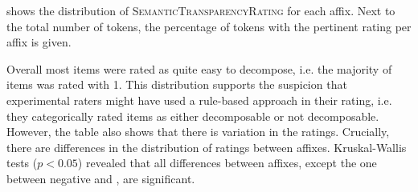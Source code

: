  shows the distribution of \textsc{SemanticTransparencyRating} for each affix. Next to the total number of tokens, the percentage of tokens with the pertinent rating per affix is given. 


\begin{table}

	\caption{Semantic Transparency Rating  by affix }
	\label{tbl:Exp distribution semantic transparency rating}
	
	
\end{table}

Overall most  items were rated as quite easy to decompose, i.e. the majority of items was rated with 1. This distribution supports the suspicion that experimental raters might have used a rule-based approach in their rating, i.e. they categorically rated items as either decomposable or not decomposable. 
However, the table also shows that there is variation in the ratings. 
Crucially, there are differences in the distribution of ratings between affixes. Kruskal-Wallis tests ($p<0.05$) revealed that all differences between affixes, except the one between negative  and , are significant.



